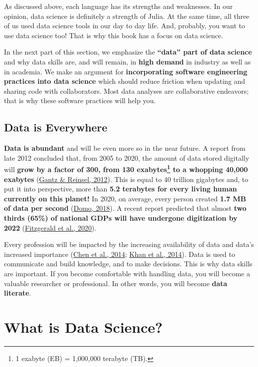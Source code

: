 \documentclass[
  notoc %
]{tufte-book}
\begin{document}
As discussed above, each language has its strengths and weaknesses. In
our opinion, data science is definitely a strength of Julia. At the same
time, all three of us used data science tools in our day to day life.
And, probably, you want to use data science too! That is why this book
has a focus on data science.

In the next part of this section, we emphasize the \textbf{``data'' part
of data science} and why data skills are, and will remain, in
\textbf{high demand} in industry as well as in academia. We make an
argument for \textbf{incorporating software engineering practices into
data science} which should reduce friction when updating and sharing
code with collaborators. Most data analyses are collaborative endeavors;
that is why these software practices will help you.

\hypertarget{sec:data_everywhere}{%
\subsection{Data is Everywhere}\label{sec:data_everywhere}}

\textbf{Data is abundant} and will be even more so in the near future. A
report from late 2012 concluded that, from 2005 to 2020, the amount of
data stored digitally will \textbf{grow by a factor of 300, from 130
exabytes\footnote{1 exabyte (EB) = 1,000,000 terabyte (TB).} to a
whopping 40,000 exabytes}
(\protect\hyperlink{ref-gantz2012digital}{Gantz \& Reinsel, 2012}). This
is equal to 40 trillion gigabytes and, to put it into perspective, more
than \textbf{5.2 terabytes for every living human currently on this
planet!} In 2020, on average, every person created \textbf{1.7 MB of
data per second} (\protect\hyperlink{ref-domo2018data}{Domo, 2018}). A
recent report predicted that almost \textbf{two thirds (65\%) of
national GDPs will have undergone digitization by 2022}
(\protect\hyperlink{ref-fitzgerald2020idc}{Fitzgerald et al., 2020}).

Every profession will be impacted by the increasing availability of data
and data's increased importance
(\protect\hyperlink{ref-chen2014big}{Chen et al., 2014};
\protect\hyperlink{ref-khan2014big}{Khan et al., 2014}). Data is used to
communicate and build knowledge, and to make decisions. This is why data
skills are important. If you become comfortable with handling data, you
will become a valuable researcher or professional. In other words, you
will become \textbf{data literate}.

\hypertarget{sec:why_data_science}{%
\section{What is Data Science?}\label{sec:why_data_science}}
\end{document}
